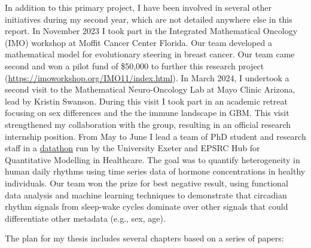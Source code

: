 \documentclass[
  letterpaper,
]{scrreprt}
\theoremstyle{definition}
\theoremstyle{remark}
\begin{document}
In addition to this primary project, I have been involved in several
other initiatives during my second year, which are not detailed anywhere
else in this report. In November 2023 I took part in the Integrated
Mathematical Oncology (IMO) workshop at Moffit Cancer Center Florida.
Our team developed a mathematical model for evolutionary steering in
breast cancer. Our team came second and won a pilot fund of \$50,000 to
further this research project
(\url{https://imoworkshop.org/IMO11/index.html}). In March 2024, I
undertook a second visit to the Mathematical Neuro-Oncology Lab at Mayo
Clinic Arizona, lead by Kristin Swanson. During this visit I took part
in an academic retreat focusing on sex differences and the the immune
landscape in GBM. This visit strengthened my collaboration with the
group, resulting in an official research internship position. From May
to June I lead a team of PhD student and research staff in a
\href{(\%3Chttps://wolfbyttner.github.io/exeter-quantitative-modelling/\%3E)}{datathon}
run by the University Exeter and EPSRC Hub for Quantitative Modelling in
Healthcare. The goal was to quantify heterogeneity in human daily
rhythms using time series data of hormone concentrations in healthy
individuals. Our team won the prize for best negative result, using
functional data analysis and machine learning techniques to demonstrate
that circadian rhythm signals from sleep-wake cycles dominate over other
signals that could differentiate other metadata (e.g., sex, age).

The plan for my thesis includes several chapters based on a series of
papers:
\end{document}
